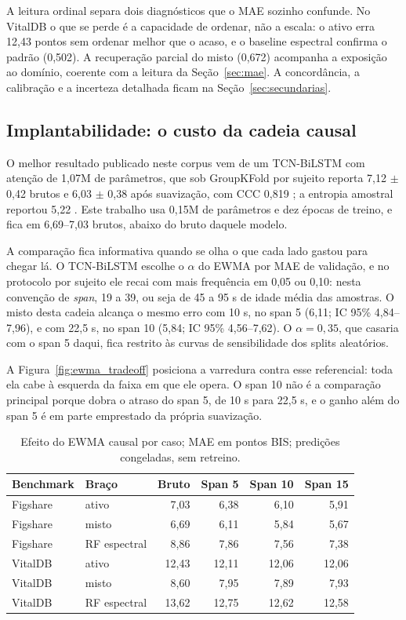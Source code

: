 \documentclass[12pt]{article}
\begin{document}
A leitura ordinal separa dois diagnósticos que o MAE sozinho confunde. No VitalDB o que se perde é a capacidade de ordenar, não a escala: o ativo erra 12,43 pontos sem ordenar melhor que o acaso, e o baseline espectral confirma o padrão (0,502). A recuperação parcial do misto (0,672) acompanha a exposição ao domínio, coerente com a leitura da Seção~\ref{sec:mae}. A concordância, a calibração e a incerteza detalhada ficam na Seção~\ref{sec:secundarias}.

\subsection{Implantabilidade: o custo da cadeia causal}
\label{sec:implantabilidade}

O melhor resultado publicado neste corpus vem de um TCN-BiLSTM com atenção de 1,07M de parâmetros, que sob GroupKFold por sujeito reporta 7,12 $\pm$ 0,42 brutos e 6,03 $\pm$ 0,38 após suavização, com CCC 0,819 \cite{sukriti2026}; a entropia amostral reportou 5,22 \cite{liu2018}. Este trabalho usa 0,15M de parâmetros e dez épocas de treino, e fica em 6,69--7,03 brutos, abaixo do bruto daquele modelo.

A comparação fica informativa quando se olha o que cada lado gastou para chegar lá. O TCN-BiLSTM escolhe o $\alpha$ do EWMA por MAE de validação, e no protocolo por sujeito ele recai com mais frequência em 0,05 ou 0,10: nesta convenção de \textit{span}, 19 a 39, ou seja de 45 a 95 s de idade média das amostras. O misto desta cadeia alcança o mesmo erro com 10 s, no span 5 (6,11; IC 95\% 4,84--7,96), e com 22,5 s, no span 10 (5,84; IC 95\% 4,56--7,62). O $\alpha = 0{,}35$, que casaria com o span 5 daqui, fica restrito às curvas de sensibilidade dos splits aleatórios.

A Figura~\ref{fig:ewma_tradeoff} posiciona a varredura contra esse referencial: toda ela cabe à esquerda da faixa em que ele opera. O span 10 não é a comparação principal porque dobra o atraso do span 5, de 10 s para 22,5 s, e o ganho além do span 5 é em parte emprestado da própria suavização.

\begin{table}[H]
\centering
\small
\setlength{\tabcolsep}{4pt}
\begin{tabular}{llrrrr}
\hline
Benchmark & Braço & Bruto & Span 5 & Span 10 & Span 15\\
\hline
Figshare & ativo & 7,03 & 6,38 & 6,10 & 5,91\\
Figshare & misto & 6,69 & 6,11 & 5,84 & 5,67\\
Figshare & RF espectral & 8,86 & 7,86 & 7,56 & 7,38\\
VitalDB & ativo & 12,43 & 12,11 & 12,06 & 12,06\\
VitalDB & misto & 8,60 & 7,95 & 7,89 & 7,93\\
VitalDB & RF espectral & 13,62 & 12,75 & 12,62 & 12,58\\
\hline
\end{tabular}
\caption{Efeito do EWMA causal por caso; MAE em pontos BIS; predições congeladas, sem retreino.}
\label{tab:ewma}
\end{table}
\end{document}
